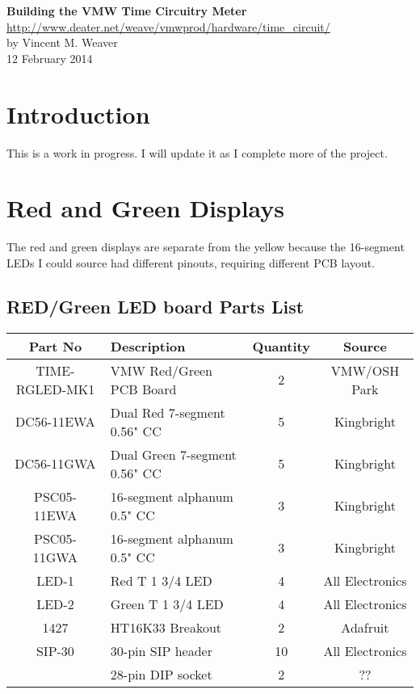 \documentclass[11pt]{article}
\begin{document}
\begin{center}
{\Large \bf Building the VMW Time Circuitry Meter}\\
\url{http://www.deater.net/weave/vmwprod/hardware/time_circuit/}\\
by Vincent M. Weaver\\
12 February 2014
\end{center}


\section{Introduction}

This is a work in progress.  I will update it as I complete more
of the project.


\pagebreak
\section{Red and Green Displays}

The red and green displays are separate from the yellow because
the 16-segment LEDs I could source had different pinouts, requiring
different PCB layout.

\subsection{RED/Green LED board Parts List}

\begin{tabular}{|c|l|c|c|}
\hline
Part No   &  Description    &  Quantity    &   Source \\
\hline
\hline
TIME-RGLED-MK1 & VMW Red/Green PCB Board       & 2 & VMW/OSH Park\\ %
\hline
DC56-11EWA     & Dual Red 7-segment 0.56" CC   & 5 & Kingbright\\ %
\hline
DC56-11GWA     & Dual Green 7-segment 0.56" CC & 5 & Kingbright\\ %
\hline
PSC05-11EWA    & 16-segment alphanum 0.5" CC   & 3 & Kingbright\\ %
\hline
PSC05-11GWA    & 16-segment alphanum 0.5" CC   & 3 & Kingbright\\ %
\hline
LED-1          & Red T 1 3/4 LED               & 4 & All Electronics\\ %
\hline
LED-2          & Green T 1 3/4 LED             & 4 & All Electronics\\ %
\hline
1427           & HT16K33 Breakout              & 2 & Adafruit\\ %
\hline
SIP-30	       & 30-pin SIP header             & 10 & All Electronics\\ %
\hline
               & 28-pin DIP socket             & 2 & ?? \\ %
\hline
\end{tabular}
\end{document}
